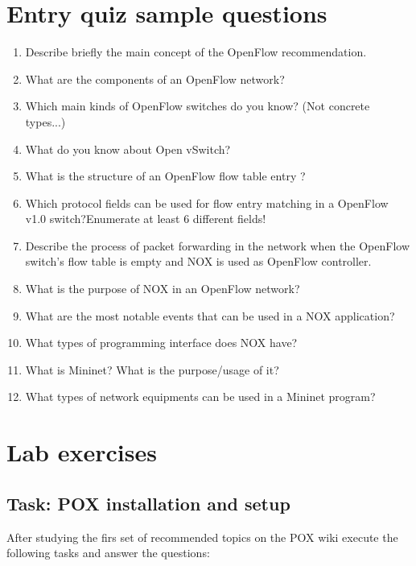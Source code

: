 \documentclass[a4paper]{article}
\begin{document}
\appendix

\section{Entry quiz sample questions}

\begin{enumerate}
    \item Describe briefly the main concept of the OpenFlow recommendation.
    \item What are the components of an OpenFlow network?
    \item Which main kinds of OpenFlow switches do you know? (Not concrete types...)
    \item What do you know about Open vSwitch?
    \item What is the structure of an OpenFlow flow table entry ?
    \item Which protocol fields can be used for flow entry matching in a OpenFlow v1.0 switch?Enumerate at least 6
          different fields!
    \item Describe the process of packet forwarding in the network when the OpenFlow switch's flow table is empty and
          NOX is used as OpenFlow controller.
    \item What is the purpose of NOX in an OpenFlow network?
    \item What are the most notable events that can be used in a NOX application?
    \item What types of programming interface does NOX have?
    \item What is Mininet? What is the purpose/usage of it?
    \item What types of network equipments can be used in a Mininet program?
\end{enumerate}

\section{Lab exercises}

\subsection{Task: POX installation and setup} \label{task:POX}

After studying the firs set of recommended topics on the POX wiki execute the following tasks and answer the
questions:
\end{document}
